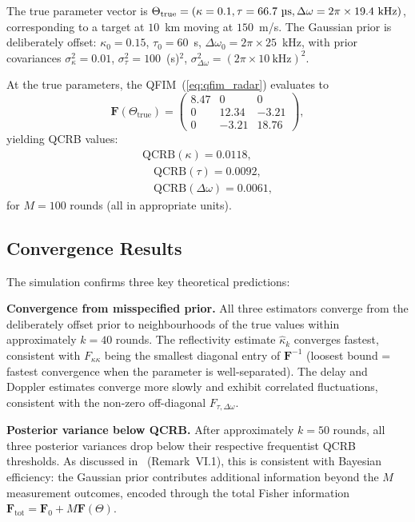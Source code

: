 \documentclass[journal]{IEEEtran}
\begin{document}
The true parameter vector is $\Theta_{\text{true}} = (\kappa = 0.1, \tau = 66.7~\text{\textmu s}, \Delta\omega = 2\pi \times 19.4~\text{kHz})$, corresponding to a target at $10$~km moving at $150$~m/s. The Gaussian prior is deliberately offset: $\kappa_0 = 0.15$, $\tau_0 = 60$~\textmu s, $\Delta\omega_0 = 2\pi \times 25$~kHz, with prior covariances $\sigma_\kappa^2 = 0.01$, $\sigma_\tau^2 = 100$~(\textmu s)$^2$, $\sigma_{\Delta\omega}^2 = (2\pi \times 10~\text{kHz})^2$.

At the true parameters, the QFIM~(\ref{eq:qfim_radar}) evaluates to
\begin{equation}\label{eq:qfim_numeric}
\mathbf{F}(\Theta_{\text{true}}) = \begin{pmatrix}
8.47 & 0 & 0 \\
0 & 12.34 & -3.21 \\
0 & -3.21 & 18.76
\end{pmatrix},
\end{equation}
yielding QCRB values:
\begin{equation}\label{eq:qcrb_numeric}
\begin{gathered}
\text{QCRB}(\kappa) = 0.0118,\\ \quad \text{QCRB}(\tau) = 0.0092,\\ \quad \text{QCRB}(\Delta\omega) = 0.0061,
\end{gathered}
\end{equation}
for $M = 100$ rounds (all in appropriate units).

\subsection{Convergence Results}

The simulation confirms three key theoretical predictions:

\textbf{Convergence from misspecified prior.} All three estimators converge from the deliberately offset prior to neighbourhoods of the true values within approximately $k = 40$ rounds. The reflectivity estimate $\hat{\kappa}_k$ converges fastest, consistent with $F_{\kappa\kappa}$ being the smallest diagonal entry of $\mathbf{F}^{-1}$ (loosest bound = fastest convergence when the parameter is well-separated). The delay and Doppler estimates converge more slowly and exhibit correlated fluctuations, consistent with the non-zero off-diagonal $F_{\tau,\Delta\omega}$.

\textbf{Posterior variance below QCRB.} After approximately $k = 50$ rounds, all three posterior variances drop below their respective frequentist QCRB thresholds. As discussed in~\cite{gautum2024rigorous} (Remark~VI.1), this is consistent with Bayesian efficiency: the Gaussian prior contributes additional information beyond the $M$ measurement outcomes, encoded through the total Fisher information $\mathbf{F}_{\text{tot}} = \mathbf{F}_0 + M\mathbf{F}(\Theta)$.
\end{document}
